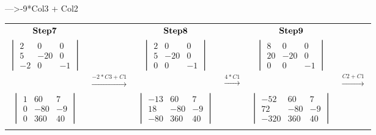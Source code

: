 \documentclass[]{article}
\begin{document}
---\textgreater{}-9*Col3 + Col2\\

\begingroup

\begin{tabular}{ c c c c c c}
$\bold{Step 7}$ &  & $\bold{Step 8}$  &  & $\bold{Step 9}$ \\
$\begin{vmatrix} 2 & 0 & 0\\ 5 & -20 & 0 \\ -2 & 0 & -1 \end{vmatrix}$ &  & $\begin{vmatrix} 2 & 0 & 0\\ 5 & -20 & 0 \\ 0 & 0 & -1 \end{vmatrix}$ &  &
$\begin{vmatrix} 8 & 0 & 0\\ 20 & -20 & 0 \\ 0 & 0 & -1 \end{vmatrix}$\\
 & $\xrightarrow{-2*C3 +C1}$ &  & $\xrightarrow{4*C1}$ & & $\xrightarrow{C2 + C1}$ \\ 
$\begin{vmatrix} 1 &   60 &   7\\ 0 &   -80 &   -9 \\ 0 &   360 &   40 \end{vmatrix}$ &  &
$\begin{vmatrix} -13 &  60 &   7\\ 18 &   -80 &   -9\\ -80 & 360 &   40 \end{vmatrix}$ & &
$\begin{vmatrix} -52 &   60 &  7\\ 72 &   -80 &   -9 \\ -320 & 360 &   40 \end{vmatrix}$\\
 &  &  \\
\end{tabular}

\endgroup

\hspace{3cm}

\begingroup
\end{document}
